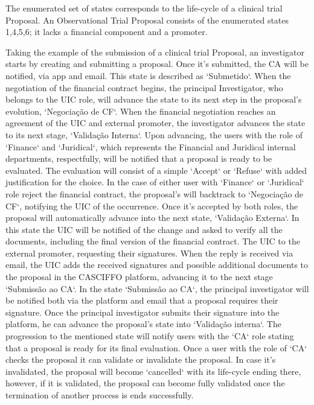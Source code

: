 The enumerated set of states corresponds to the life-cycle of a clinical trial Proposal. An Observational Trial Proposal consists of the enumerated states {1,4,5,6}; it lacks a financial component and a promoter.  

Taking the example of the submission of a clinical trial Proposal, an investigator starts by creating and submitting a proposal. Once it's submitted, the CA will be notified, via app and email. This state is described as `Submetido`.  
When the negotiation of the financial contract begins, the principal Investigator, who belongs to the UIC role, will advance the state to its next step in the proposal's evolution, `Negociação de CF`.  
When the financial negotiation reaches an agreement of the UIC and external promoter, the investigator advances the state to its next stage, `Validação Interna`. Upon advancing, the users with the role of `Finance` and `Juridical`, which represents the Financial and Juridical internal departments, respectfully, will be notified that a proposal is ready to be evaluated. The evaluation will consist of a simple `Accept` or `Refuse` with added justification for the choice. In the case of either user with `Finance` or `Juridical` role reject the financial contract, the proposal's will backtrack to `Negociação de CF`, notifying the UIC of the occurrence.  
Once it's accepted by both roles, the proposal will automatically advance into the next state, `Validação Externa`. In this state the UIC will be notified of the change and asked to verify all the documents, including the final version of the financial contract. The UIC to the external promoter, requesting their signatures. When the reply is received via email, the UIC adds the received signatures and possible additional documents to the proposal in the CASCIFFO platform, advancing it to the next stage `Submissão ao CA`.  
In the state `Submissão ao CA`, the principal investigator will be notified both via the platform and email that a proposal requires their signature. Once the principal investigator submits their signature into the platform, he can advance the proposal's state into `Validação interna`. The progression to the mentioned state will notify users with the `CA` role stating that a proposal is ready for its final evaluation.  
Once a user with the role of `CA` checks the proposal it can validate or invalidate the proposal. In case it's invalidated, the proposal will become `cancelled` with its life-cycle ending there, however, if it is validated, the proposal can become fully validated once the termination of another process is ends successfully.  
